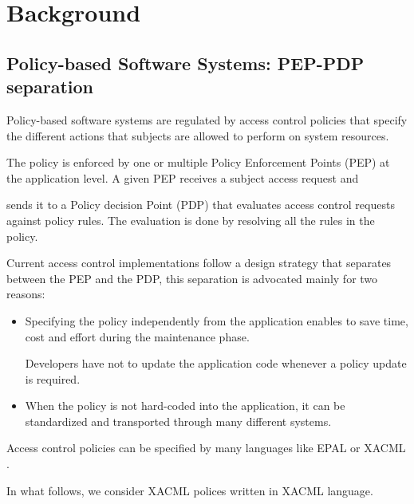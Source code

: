 
  
\section{Background}
\label{sec:background}
\subsection{Policy-based Software Systems: PEP-PDP separation}
Policy-based software systems are regulated by access control policies that specify the different actions that subjects are allowed to perform on system resources. 

The policy is enforced by one or multiple Policy Enforcement Points (PEP) at the application level. A given PEP receives a subject access request and 

sends it to a Policy decision Point (PDP) that evaluates access control requests against policy rules. The evaluation is done by resolving all the rules in the policy. 

Current access control implementations follow a design strategy that separates between the PEP and the PDP, this separation is advocated mainly for two reasons:

\begin{itemize}

\item Specifying the policy independently from the application enables to save time, cost and effort during the maintenance phase. 

Developers have not to update the application code whenever a policy update is required.

\item When the policy is not hard-coded into the application, it can be standardized and transported through many different systems.

\end{itemize}

Access control policies can be specified by many languages like EPAL \cite{epal} or XACML \cite {oasis05:xacml}. 

In what follows, we consider XACML polices written in XACML language.





